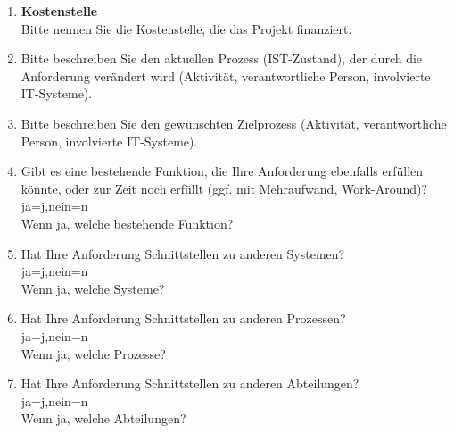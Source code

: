 \begin{Form}
\begin{enumerate}
  	\item \textbf{Kostenstelle} \\ 
  	Bitte nennen Sie die Kostenstelle, die das Projekt finanziert: \TextField[name=costen, width=3.5cm, value={}]{}
  	
  	\item Bitte beschreiben Sie den aktuellen Prozess (IST-Zustand), der durch die Anforderung verändert wird (Aktivität, verantwortliche Person, involvierte IT-Systeme). \\
  	\TextField[multiline, name=proces,width=0.9\textwidth,  height=2cm, value={}]{}
  
  \item Bitte beschreiben Sie den gewünschten Zielprozess (Aktivität, verantwortliche Person, involvierte IT-Systeme). \\ 
  \TextField[multiline, name=descrgoal,width=0.9\textwidth,  height=2cm, value={}]{}

	\item Gibt es eine bestehende Funktion, die Ihre Anforderung ebenfalls erfüllen könnte, oder zur Zeit noch erfüllt (ggf. mit Mehraufwand, Work-Around)? \\ 
	\ChoiceMenu[radio, radiosymbol=6 default=n, width=0.5cm, name=func]{} {ja=j,nein=n} \\
	Wenn ja, welche bestehende Funktion? \\
	\TextField[multiline, name=jfunc,width=0.9\textwidth,  height=2cm, value={}]{}
	
	\item Hat Ihre Anforderung Schnittstellen zu anderen Systemen? \\ 
	\ChoiceMenu[radio, radiosymbol=6 default=n, width=0.5cm, name=consesyst]{} {ja=j,nein=n} \\
	Wenn ja, welche Systeme? \\
	\TextField[multiline, name=jconsesyst,width=0.9\textwidth,  height=2cm, value={}]{}
	\newpage
	
	\item Hat Ihre Anforderung Schnittstellen zu anderen Prozessen? \\ 
	\ChoiceMenu[radio, radiosymbol=6 default=n, width=0.5cm, name=consepro]{} {ja=j,nein=n} \\
	Wenn ja, welche Prozesse? \\
	\TextField[multiline, name=jconsepro,width=0.9\textwidth,  height=2cm, value={}]{}
	
	\item Hat Ihre Anforderung Schnittstellen zu anderen Abteilungen? \\ 
	\ChoiceMenu[radio, radiosymbol=6 default=n, width=0.5cm, name=consedep]{} {ja=j,nein=n} \\
	Wenn ja, welche Abteilungen? \\
	\TextField[multiline, name=jconsedep,width=0.9\textwidth,  height=2cm, value={}]{}
	

\end{enumerate}
\end{Form}
